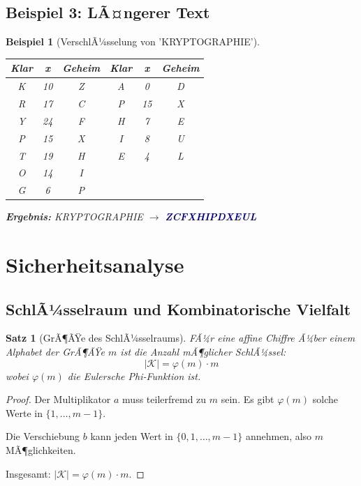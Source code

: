 ﻿\documentclass[12pt,a4paper]{article}
\newtheorem{theorem}{Satz}
\newtheorem{example}{Beispiel}
\begin{document}
	\subsection{Beispiel 3: LÃ¤ngerer Text}
	
	\begin{example}[VerschlÃ¼sselung von 'KRYPTOGRAPHIE']
		
		\begin{center}
			\begin{tabular}{c|c|c||c|c|c}
				\textbf{Klar} & \textbf{x} & \textbf{Geheim} & \textbf{Klar} & \textbf{x} & \textbf{Geheim} \\
				\hline
				K & 10 & Z & A & 0 & D \\
				R & 17 & C & P & 15 & X \\
				Y & 24 & F & H & 7 & E \\
				P & 15 & X & I & 8 & U \\
				T & 19 & H & E & 4 & L \\
				O & 14 & I & & & \\
				G & 6 & P & & & \\
			\end{tabular}
		\end{center}
		
		\textbf{Ergebnis:} KRYPTOGRAPHIE $\to$ \textcolor{darkblue}{\textbf{ZCFXHIPDXEUL}}
	\end{example}
	
	\section{Sicherheitsanalyse}
	
	\subsection{SchlÃ¼sselraum und Kombinatorische Vielfalt}
	
	\begin{theorem}[GrÃ¶ÃŸe des SchlÃ¼sselraums]
		FÃ¼r eine affine Chiffre Ã¼ber einem Alphabet der GrÃ¶ÃŸe $m$ ist die Anzahl mÃ¶glicher SchlÃ¼ssel:
		\begin{equation}
			|\mathcal{K}| = \varphi(m) \cdot m
		\end{equation}
		wobei $\varphi(m)$ die Eulersche Phi-Funktion ist.
	\end{theorem}
	
	\begin{proof}
		Der Multiplikator $a$ muss teilerfremd zu $m$ sein. Es gibt $\varphi(m)$ solche Werte in 
		$\{1, \ldots, m-1\}$.
		
		Die Verschiebung $b$ kann jeden Wert in $\{0, 1, \ldots, m-1\}$ annehmen, also $m$ MÃ¶glichkeiten.
		
		Insgesamt: $|\mathcal{K}| = \varphi(m) \cdot m$.
	\end{proof}
	
\end{document}
